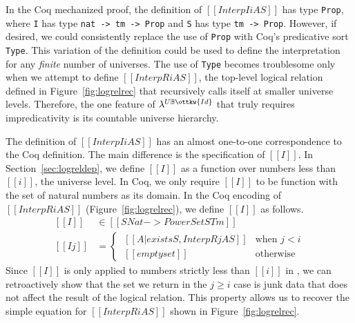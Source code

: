 \documentclass[acmsmall,screen=true,
\ifpublic review=false\else,review=true\fi
  ,anonymous=\ifanonymous true\else false\fi]{acmart}
\newcommand{\lang}{$\lambda^{U\mathbb{B}\ottkw{Id}}$\xspace}
\newcommand{\scw}[1]{}
\begin{document}
In the Coq mechanized proof, the definition of $[[Interp I i A S]]$ has type
\texttt{Prop}, where \texttt{I} has type \texttt{nat -> tm -> Prop} and \texttt{S}
has type \texttt {tm -> Prop}.  However, if desired, we could consistently
replace the use of \texttt{Prop} with Coq's predicative sort
\texttt{Type}. This variation of the definition could be used to define the
interpretation for any \emph{finite} number of universes. The use of
\texttt{Type} becomes troublesome only when we attempt to define
$[[InterpR i A S]]$, the top-level logical relation defined in
Figure~\ref{fig:logrelrec} that recursively calls itself at smaller universe
levels. Therefore, the one feature of \lang{} that truly requires impredicativity
is its countable universe hierarchy. \scw{I'm not sure the last part of this sentence
adds much: ``Although, lemmas such as the
admissibility of \rref{I-PiAlt} (Lemma~\ref{lemma:piintroalt}) not only simply
our mechanization, but also give better intuition on what our logical relation
means.'' Yes, we need impredicativity to define these lemmas, but without impredicativity
our logical relation means something else.}

The definition of $[[Interp I i A S]]$ has an almost one-to-one
correspondence to the Coq definition. The main difference is the
specification of $[[I]]$. In
Section~\ref{sec:logreldep}, we define $[[I]]$ as a function over
numbers less than $[[i]]$, the universe level. In Coq, we only require
$[[I]]$ to be function with the set of natural numbers as its domain.
In the Coq encoding of $[[InterpR i A S]]$ (Figure~\ref{fig:logrelrec}), we define $[[I]]$ as follows.
\begin{equation*}
  \begin{split}
    [[I]]   &\in [[SNat -> PowerSet STm]] \\
    [[I j]] &=
     \begin{cases}
      \ [[{A | exists S , InterpR j A S}]] & \text{when } j < i \\
      \ [[emptyset]] & \text{otherwise}
    \end{cases}
  \end{split}
\end{equation*}
Since $[[I]]$ is only applied to numbers strictly less than $[[i]]$ in
, we can retroactively show that the set we return in the $j
\geq i$ case is junk data that does not affect the result of the logical
relation. This property allows us to recover the simple equation for $[[InterpR i A S]]$ shown in Figure~\ref{fig:logrelrec}.
\end{document}
